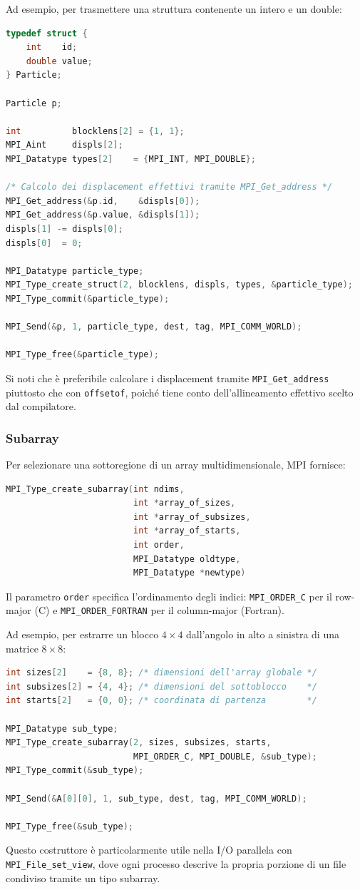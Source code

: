 Ad esempio, per trasmettere una struttura contenente un intero e un double:
\begin{lstlisting}[language=C, numbers=none]
typedef struct {
    int    id;
    double value;
} Particle;

Particle p;

int          blocklens[2] = {1, 1};
MPI_Aint     displs[2];
MPI_Datatype types[2]    = {MPI_INT, MPI_DOUBLE};

/* Calcolo dei displacement effettivi tramite MPI_Get_address */
MPI_Get_address(&p.id,    &displs[0]);
MPI_Get_address(&p.value, &displs[1]);
displs[1] -= displs[0];
displs[0]  = 0;

MPI_Datatype particle_type;
MPI_Type_create_struct(2, blocklens, displs, types, &particle_type);
MPI_Type_commit(&particle_type);

MPI_Send(&p, 1, particle_type, dest, tag, MPI_COMM_WORLD);

MPI_Type_free(&particle_type);
\end{lstlisting}
Si noti che è preferibile calcolare i displacement tramite \texttt{MPI\_Get\_address} piuttosto che con \texttt{offsetof}, poiché tiene conto dell'allineamento effettivo scelto dal compilatore.

\subsubsection{Subarray}
Per selezionare una sottoregione di un array multidimensionale, MPI fornisce:
\begin{lstlisting}[language=C, numbers=none]
MPI_Type_create_subarray(int ndims,
                         int *array_of_sizes,
                         int *array_of_subsizes,
                         int *array_of_starts,
                         int order,
                         MPI_Datatype oldtype,
                         MPI_Datatype *newtype)
\end{lstlisting}
Il parametro \texttt{order} specifica l'ordinamento degli indici: \texttt{MPI\_ORDER\_C} per il row-major (C) e \texttt{MPI\_ORDER\_FORTRAN} per il column-major (Fortran).

Ad esempio, per estrarre un blocco \(4 \times 4\) dall'angolo in alto a sinistra di una matrice \(8 \times 8\):
\begin{lstlisting}[language=C, numbers=none]
int sizes[2]    = {8, 8}; /* dimensioni dell'array globale */
int subsizes[2] = {4, 4}; /* dimensioni del sottoblocco    */
int starts[2]   = {0, 0}; /* coordinata di partenza        */

MPI_Datatype sub_type;
MPI_Type_create_subarray(2, sizes, subsizes, starts,
                         MPI_ORDER_C, MPI_DOUBLE, &sub_type);
MPI_Type_commit(&sub_type);

MPI_Send(&A[0][0], 1, sub_type, dest, tag, MPI_COMM_WORLD);

MPI_Type_free(&sub_type);
\end{lstlisting}
Questo costruttore è particolarmente utile nella I/O parallela con \texttt{MPI\_File\_set\_view}, dove ogni processo descrive la propria porzione di un file condiviso tramite un tipo subarray.

